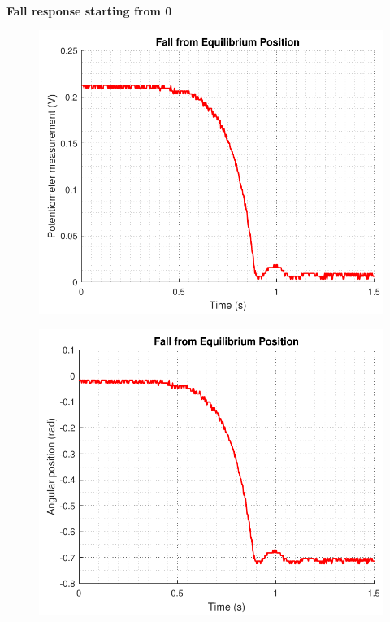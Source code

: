 \small\textbf{Fall response starting from \si{0^\circ}}

\begin{minipage}{\linewidth}
	\begin{minipage}{0.45\linewidth}
		\begin{figure}[H]
			\includegraphics[scale=.53]{figures/FallVolt}
			\centering
			\vspace{-.4cm}
			\captionsetup{justification=centering}
			\label{FallVolt}
		\end{figure}
	\end{minipage}
	\hspace{0.03\linewidth}
	\begin{minipage}{0.45\linewidth}
		\begin{figure}[H]\vspace{-4mm}
			\includegraphics[scale=.53]{figures/FallRad}
			\centering
			\vspace{-.4cm}
			\captionsetup{justification=centering}
			\label{FallRad}
		\end{figure}
	\end{minipage}
\end{minipage} 

